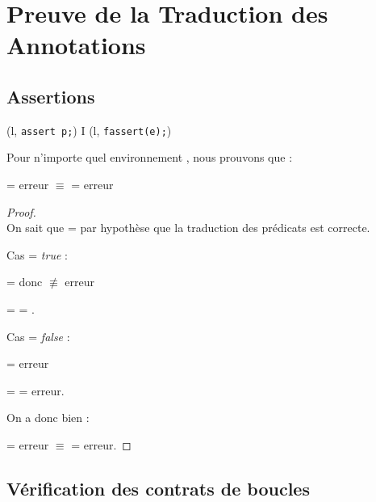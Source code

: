 \section{Preuve de la Traduction des Annotations}
\label{sec:annotation-translation}


\subsection{Assertions}


{\scriptsize
  {
    {(l, \mbox{\lstinline'assert p;'})
       I \concat (l, \mbox{\lstinline'fassert(e);'})}
  }
}


Pour n'importe quel environnement \env, nous prouvons que :

 = erreur
$\equiv$  = erreur


\begin{proof}
  ~\\
  On sait que  =  par hypothèse que
  la traduction des prédicats est correcte.

  Cas  = \textit{true} :

   = \env
  donc  $\not \equiv$ erreur

  = 
  = .


  Cas  = \textit{false} :

   = erreur

  = 
  = erreur.

  On a donc bien :

   = erreur
  $\equiv$  = erreur.
\end{proof}


\subsection{Vérification des contrats de boucles}


